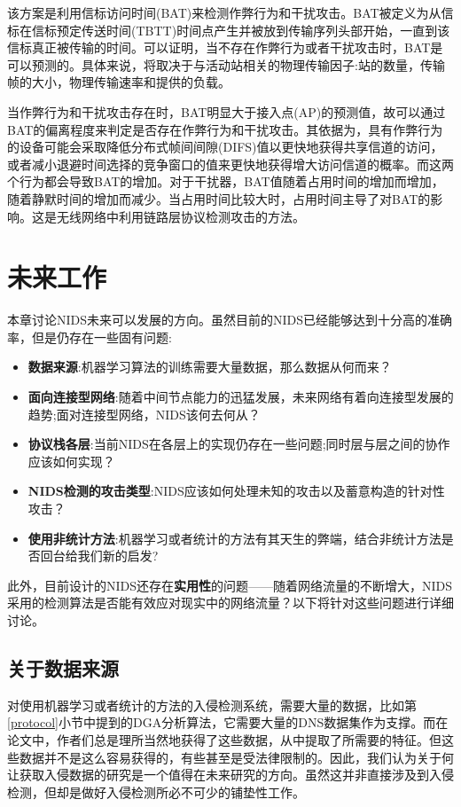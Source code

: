 \documentclass[12pt]{article} %
\begin{document}
该方案是利用信标访问时间(BAT)来检测作弊行为和干扰攻击。BAT被定义为从信标在信标预定传送时间(TBTT)时间点产生并被放到传输序列头部开始，一直到该信标真正被传输的时间。可以证明，当不存在作弊行为或者干扰攻击时，BAT是可以预测的。具体来说，将取决于与活动站相关的物理传输因子:站的数量，传输帧的大小，物理传输速率和提供的负载。

当作弊行为和干扰攻击存在时，BAT明显大于接入点(AP)的预测值，故可以通过BAT的偏离程度来判定是否存在作弊行为和干扰攻击。其依据为，具有作弊行为的设备可能会采取降低分布式帧间间隙(DIFS)值以更快地获得共享信道的访问，或者减小退避时间选择的竞争窗口的值来更快地获得增大访问信道的概率。而这两个行为都会导致BAT的增加。对于干扰器，BAT值随着占用时间的增加而增加，随着静默时间的增加而减少。当占用时间比较大时，占用时间主导了对BAT的影响。这是无线网络中利用链路层协议检测攻击的方法。
\section{未来工作}
\label{future}

本章讨论NIDS未来可以发展的方向。虽然目前的NIDS已经能够达到十分高的准确率，但是仍存在一些固有问题:

\begin{itemize}
	\item \textbf{数据来源}:机器学习算法的训练需要大量数据，那么数据从何而来？
	\item \textbf{面向连接型网络}:随着中间节点能力的迅猛发展，未来网络有着向连接型发展的趋势;面对连接型网络，NIDS该何去何从？
	\item \textbf{协议栈各层}:当前NIDS在各层上的实现仍存在一些问题;同时层与层之间的协作应该如何实现？
	\item \textbf{NIDS检测的攻击类型}:NIDS应该如何处理未知的攻击以及蓄意构造的针对性攻击？
	\item \textbf{使用非统计方法}:机器学习或者统计的方法有其天生的弊端，结合非统计方法是否回台给我们新的启发?
\end{itemize}

此外，目前设计的NIDS还存在\textbf{实用性}的问题——随着网络流量的不断增大，NIDS采用的检测算法是否能有效应对现实中的网络流量？以下将针对这些问题进行详细讨论。
\subsection{关于数据来源}
\label{data}

对使用机器学习或者统计的方法的入侵检测系统，需要大量的数据，比如第\ref{protocol}小节中提到的DGA分析算法，它需要大量的DNS数据集作为支撑。而在论文中，作者们总是理所当然地获得了这些数据，从中提取了所需要的特征。但这些数据并不是这么容易获得的，有些甚至是受法律限制的。因此，我们认为关于何让获取入侵数据的研究是一个值得在未来研究的方向。虽然这并非直接涉及到入侵检测，但却是做好入侵检测所必不可少的铺垫性工作。
\end{document}
